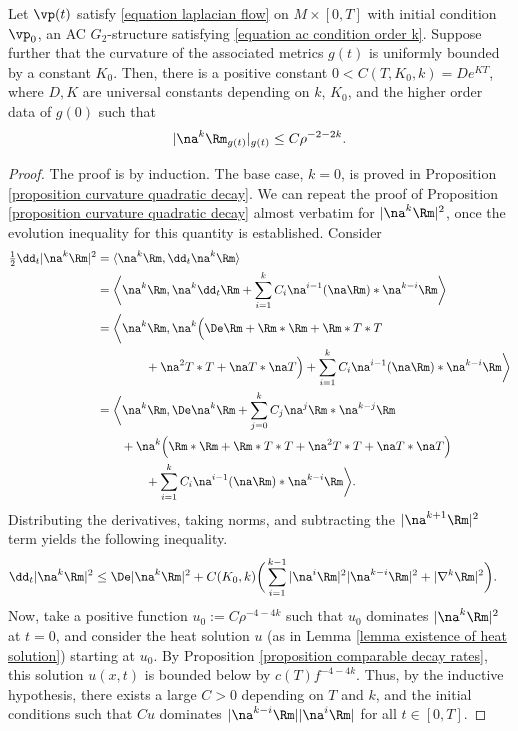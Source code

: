 \documentclass[hidelinks, 12pt, oneside, reqno]{amsart}
\begin{document}
\begin{cor}\label{corollary higher order curvature decay}
Let $\vp(t)$ satisfy \eqref{equation laplacian flow} on $M \times [0,T]$ with initial condition $\vp_0$, an AC $G_2$-structure satisfying \eqref{equation ac condition order k}. Suppose further that the curvature of the associated metrics $g(t)$ is uniformly bounded by a constant $K_0$. Then, there is a positive constant $0 < C(T,K_0,k) = De^{KT}$, where $D,K$ are universal constants depending on $k$, $K_0$, and the higher order data of $g(0)$ such that 
\[
|\na^k \Rm_{g(t)}|_{g(t)} \le C \rho^{-2-2k}. 
\]
\end{cor}

\begin{proof} The proof is by induction. The base case, $k= 0$, is proved in Proposition \ref{proposition curvature quadratic decay}.
    We can repeat the proof of Proposition \ref{proposition curvature quadratic decay} almost verbatim for $|\na^k \Rm|^2$, once the evolution inequality for this quantity is established. Consider
    \begin{align*}
        \tfrac12 \dd_t |\na^k \Rm|^2 &= \langle  \na^k \Rm, \dd_t \na^k \Rm \rangle \\
        &= \bigg\langle  \na^k \Rm,  \na^k \dd_t \Rm + \sum_{i=1}^k C_i\na^{i-1}(\na \Rm) * \na^{k-i}\Rm \bigg\rangle \\
        &= \bigg\langle  \na^k \Rm,  \na^k \Big( \De \Rm + \Rm * \Rm + \Rm * T * T \\
        &\qquad \qquad + \na^2 T * T + \na T * \na T \Big) +  \sum_{i=1}^k C_i \na^{i-1}(\na \Rm) * \na^{k-i}\Rm \bigg\rangle \\
        &= \bigg\langle  \na^k \Rm,  \De \na^k \Rm +  \sum_{j=0}^k C_j \na^j \Rm * \na^{k-j} \Rm \\
        &\qquad + \na^k \Big(  \Rm * \Rm + \Rm * T * T + \na^2 T * T + \na T * \na T \Big) \\
        &\qquad \qquad+ \sum_{i=1}^k C_i \na^{i-1}(\na \Rm) * \na^{k-i}\Rm \bigg\rangle.
    \end{align*}
    Distributing the derivatives, taking norms, and subtracting the $|\na^{k+1}\Rm|^2$ term yields the following inequality. 
    \begin{align*}
        \dd_t |\na^k \Rm|^2 &\le \De |\na^k \Rm|^2 + C(K_0,k)\bigg(\sum_{i=1}^{k-1} |\na^i \Rm|^2|\na^{k-i} \Rm|^2 + |\nabla^k \Rm|^2\bigg).
    \end{align*}
    Now, take a positive function $u_0 := C\rho^{-4 -4k}$ such that $u_0$ dominates $|\na^k \Rm|^2$ at $t=0$, and consider the heat solution $u$ (as in Lemma \ref{lemma existence of heat solution}) starting at $u_0$.  By Proposition \ref{proposition comparable decay rates}, this solution $u(x,t)$ is bounded below by $c(T)f^{-4-4k}$. Thus, by the inductive hypothesis, there exists a large $C>0$ depending on $T$ and $k$, and the initial conditions such that $Cu$ dominates $|\na^{k-i} \Rm||\na^i \Rm|$ for all $t \in [0,T]$. 
    

\end{proof}
\end{document}
